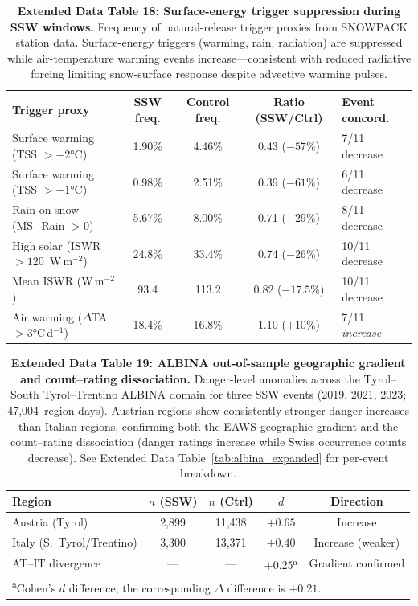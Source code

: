 \documentclass[11pt,letterpaper]{article}
\begin{document}
\begin{table}[!ht]
\centering
\caption{\textbf{Extended Data Table 18: Surface-energy trigger suppression during SSW windows.}
Frequency of natural-release trigger proxies from SNOWPACK station data. Surface-energy triggers (warming, rain, radiation) are suppressed while air-temperature warming events increase---consistent with reduced radiative forcing limiting snow-surface response despite advective warming pulses.}
\label{tab:triggers}
\small
\begin{tabular}{lcccl}
\toprule
Trigger proxy & SSW freq. & Control freq. & Ratio (SSW/Ctrl) & Event concord. \\
\midrule
Surface warming (TSS $> -2$°C) & 1.90\% & 4.46\% & 0.43 ($-57\%$) & 7/11 decrease \\
Surface warming (TSS $> -1$°C) & 0.98\% & 2.51\% & 0.39 ($-61\%$) & 6/11 decrease \\
Rain-on-snow (MS\_Rain $> 0$) & 5.67\% & 8.00\% & 0.71 ($-29\%$) & 8/11 decrease \\
High solar (ISWR $> 120$~W\,m$^{-2}$) & 24.8\% & 33.4\% & 0.74 ($-26\%$) & 10/11 decrease \\
Mean ISWR (W\,m$^{-2}$) & 93.4 & 113.2 & 0.82 ($-17.5\%$) & 10/11 decrease \\
\midrule
Air warming ($\Delta$TA $> 3$°C\,d$^{-1}$) & 18.4\% & 16.8\% & 1.10 ($+10\%$) & 7/11 \emph{increase} \\
\bottomrule
\end{tabular}
\end{table}

\begin{table}[!ht]
\centering
\caption{\textbf{Extended Data Table 19: ALBINA out-of-sample geographic gradient and count--rating dissociation.}
Danger-level anomalies across the Tyrol--South Tyrol--Trentino ALBINA domain for three SSW events (2019, 2021, 2023; 47,004~region-days). Austrian regions show consistently stronger danger increases than Italian regions, confirming both the EAWS geographic gradient and the count--rating dissociation (danger ratings increase while Swiss occurrence counts decrease). See Extended Data Table~\ref{tab:albina_expanded} for per-event breakdown.}
\label{tab:albina}
\small
\begin{tabular}{lcccc}
\toprule
Region & $n$ (SSW) & $n$ (Ctrl) & $d$ & Direction \\
\midrule
Austria (Tyrol) & 2,899 & 11,438 & $+0.65$ & Increase \\
Italy (S.\ Tyrol/Trentino) & 3,300 & 13,371 & $+0.40$ & Increase (weaker) \\
\midrule
AT--IT divergence & --- & --- & $+0.25$\textsuperscript{a} & Gradient confirmed \\
\bottomrule
\multicolumn{5}{l}{\footnotesize \textsuperscript{a}Cohen's $d$ difference; the corresponding $\Delta$ difference is $+0.21$.} \\
\end{tabular}
\end{table}
\end{document}
